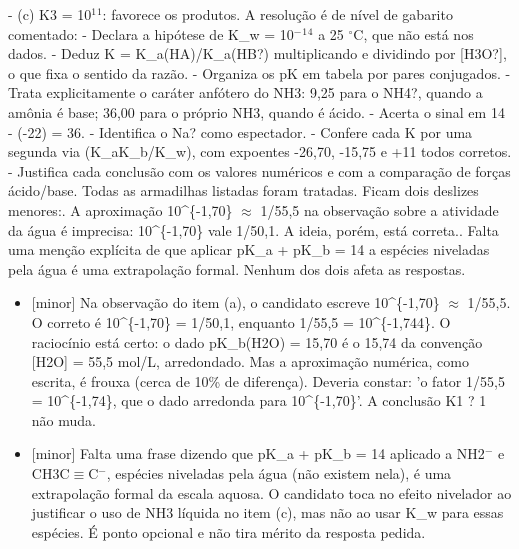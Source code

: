 \documentclass{article}%
\begin{document}
{-} (c) K3 = 10$^{1}$$^{1}$: favorece os produtos.\newline%
\newline%
A resolução é de nível de gabarito comentado:\newline%
{-} Declara a hipótese de K\_w = 10$^{-}$$^{1}$$^{4}$ a 25 $^\circ$C, que não está nos dados.\newline%
{-} Deduz K = K\_a(HA)/K\_a(HB?) multiplicando e dividindo por {[}H3O?{]}, o que fixa o sentido da razão.\newline%
{-} Organiza os pK em tabela por pares conjugados.\newline%
{-} Trata explicitamente o caráter anfótero do NH3: 9,25 para o NH4?, quando a amônia é base; 36,00 para o próprio NH3, quando é ácido.\newline%
{-} Acerta o sinal em 14 - (-22) = 36.\newline%
{-} Identifica o Na? como espectador.\newline%
{-} Confere cada K por uma segunda via (K\_aK\_b/K\_w), com expoentes -26,70, -15,75 e +11 todos corretos.\newline%
{-} Justifica cada conclusão com os valores numéricos e com a comparação de forças ácido/base.\newline%
\newline%
Todas as armadilhas listadas foram tratadas. Ficam dois deslizes menores:. A aproximação 10\^{}\{-1,70\} $\approx$ 1/55,5 na observação sobre a atividade da água é imprecisa: 10\^{}\{-1,70\} vale 1/50,1. A ideia, porém, está correta.. Falta uma menção explícita de que aplicar pK\_a + pK\_b = 14 a espécies niveladas pela água é uma extrapolação formal.\newline%
\newline%
Nenhum dos dois afeta as respostas.%
\begin{itemize}%
\item%
{[}minor{]} Na observação do item (a), o candidato escreve 10\^{}\{{-}1,70\} $\approx$ 1/55,5. O correto é 10\^{}\{{-}1,70\} = 1/50,1, enquanto 1/55,5 = 10\^{}\{{-}1,744\}. O raciocínio está certo: o dado pK\_b(H2O) = 15,70 é o 15,74 da convenção {[}H2O{]} = 55,5 mol/L, arredondado. Mas a aproximação numérica, como escrita, é frouxa (cerca de 10\% de diferença). Deveria constar: 'o fator 1/55,5 = 10\^{}\{{-}1,74\}, que o dado arredonda para 10\^{}\{{-}1,70\}'. A conclusão K1 ? 1 não muda.%
\item%
{[}minor{]} Falta uma frase dizendo que pK\_a + pK\_b = 14 aplicado a NH2$^{-}$ e CH3C$\equiv$C$^{-}$, espécies niveladas pela água (não existem nela), é uma extrapolação formal da escala aquosa. O candidato toca no efeito nivelador ao justificar o uso de NH3 líquida no item (c), mas não ao usar K\_w para essas espécies. É ponto opcional e não tira mérito da resposta pedida.%
\end{itemize}%
\end{document}
